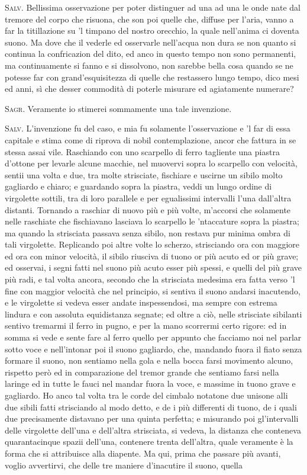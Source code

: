 \documentclass[11pt,twoside,openany]{book}
\newcommand{\speaker}[1]{\textcolor{rubric}{\textsc{#1}}\space}
\begin{document}
\speaker{Salv.} Bellissima osservazione per poter distinguer ad una ad una le onde nate dal tremore del corpo che risuona, che son poi quelle che, diffuse per l'aria, vanno a far la titillazione su 'l timpano del nostro orecchio, la quale nell'anima ci doventa suono. Ma dove che il vederle ed osservarle nell'acqua non dura se non quanto si continua la confricazion del dito, ed anco in questo tempo non sono permanenti, ma continuamente si fanno e si dissolvono, non sarebbe bella cosa quando se ne potesse far con grand'esquisitezza di quelle che restassero lungo tempo, dico mesi ed anni, sì che desser commodità di poterle misurare ed agiatamente numerare?

\speaker{Sagr.} Veramente io stimerei sommamente una tale invenzione.

\speaker{Salv.} L'invenzione fu del caso, e mia fu solamente l'osservazione e 'l far di essa capitale e stima come di riprova di nobil contemplazione, ancor che fattura in se stessa assai vile. Raschiando con uno scarpello di ferro tagliente una piastra d'ottone per levarle alcune macchie, nel muovervi sopra lo scarpello con velocità, sentii una volta e due, tra molte strisciate, fischiare e uscirne un sibilo molto gagliardo e chiaro; e guardando sopra la piastra, veddi un lungo ordine di virgolette sottili, tra di loro parallele e per egualissimi intervalli l'una dall'altra distanti. Tornando a raschiar di nuovo più e più volte, m'accorsi che solamente nelle raschiate che fischiavano lasciava lo scarpello le 'ntaccature sopra la piastra; ma quando la strisciata passava senza sibilo, non restava pur minima ombra di tali virgolette. Replicando poi altre volte lo scherzo, strisciando ora con maggiore ed ora con minor velocità, il sibilo riusciva di tuono or più acuto ed or più grave; ed osservai, i segni fatti nel suono più acuto esser più spessi, e quelli del più grave più radi, e tal volta ancora, secondo che la strisciata medesima era fatta verso 'l fine con maggior velocità che nel principio, si sentiva il suono andarsi inacutendo, e le virgolette si vedeva esser andate inspessendosi, ma sempre con estrema lindura e con assoluta equidistanza segnate; ed oltre a ciò, nelle strisciate sibilanti sentivo tremarmi il ferro in pugno, e per la mano scorrermi certo rigore: ed in somma si vede e sente fare al ferro quello per appunto che facciamo noi nel parlar sotto voce e nell'intonar poi il suono gagliardo, che, mandando fuora il fiato senza formare il suono, non sentiamo nella gola e nella bocca farsi movimento alcuno, rispetto però ed in comparazione del tremor grande che sentiamo farsi nella laringe ed in tutte le fauci nel mandar fuora la voce, e massime in tuono grave e gagliardo. Ho anco tal volta tra le corde del cimbalo notatone due unisone alli due sibili fatti strisciando al modo detto, e de i più differenti di tuono, de i quali due precisamente distavano per una quinta perfetta; e misurando poi gl'intervalli delle virgolette dell'una e dell'altra strisciata, si vedeva, la distanza che conteneva quarantacinque spazii dell'una, contenere trenta dell'altra, quale veramente è la forma che si attribuisce alla diapente. Ma qui, prima che passare più avanti, voglio avvertirvi, che delle tre maniere d'inacutire il suono, quella 
\end{document}
